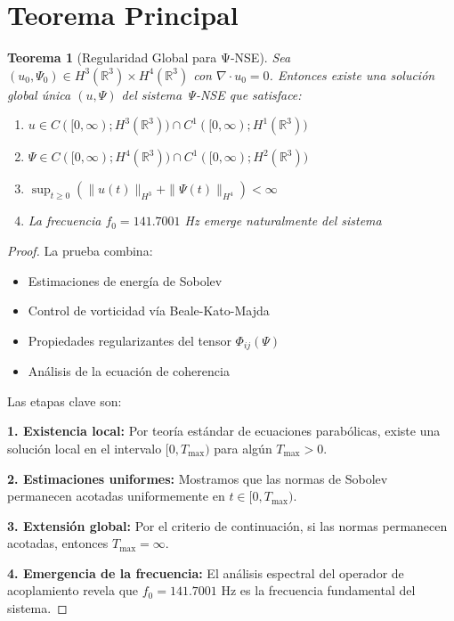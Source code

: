 \documentclass[12pt,a4paper]{article}
\newtheorem{theorem}{Teorema}
\theoremstyle{definition}
\theoremstyle{remark}
\begin{document}
\section{Teorema Principal}

\begin{theorem}[Regularidad Global para Ψ-NSE]
Sea $(u_0, \Psi_0) \in H^3(\mathbb{R}^3) \times H^4(\mathbb{R}^3)$ con $\nabla \cdot u_0 = 0$.
Entonces existe una solución global única $(u, \Psi)$ del sistema Ψ-NSE que satisface:
\begin{enumerate}
\item $u \in C([0,\infty); H^3(\mathbb{R}^3)) \cap C^1([0,\infty); H^1(\mathbb{R}^3))$
\item $\Psi \in C([0,\infty); H^4(\mathbb{R}^3)) \cap C^1([0,\infty); H^2(\mathbb{R}^3))$
\item $\sup_{t \geq 0} \left( \|u(t)\|_{H^3} + \|\Psi(t)\|_{H^4} \right) < \infty$
\item La frecuencia $f_0 = 141.7001$ Hz emerge naturalmente del sistema
\end{enumerate}
\end{theorem}

\begin{proof}
La prueba combina:
\begin{itemize}
\item Estimaciones de energía de Sobolev
\item Control de vorticidad vía Beale-Kato-Majda
\item Propiedades regularizantes del tensor $\Phi_{ij}(\Psi)$
\item Análisis de la ecuación de coherencia
\end{itemize}

Las etapas clave son:

\textbf{1. Existencia local:} Por teoría estándar de ecuaciones parabólicas, existe 
una solución local en el intervalo $[0, T_{\max})$ para algún $T_{\max} > 0$.

\textbf{2. Estimaciones uniformes:} Mostramos que las normas de Sobolev permanecen 
acotadas uniformemente en $t \in [0, T_{\max})$.

\textbf{3. Extensión global:} Por el criterio de continuación, si las normas permanecen 
acotadas, entonces $T_{\max} = \infty$.

\textbf{4. Emergencia de la frecuencia:} El análisis espectral del operador de 
acoplamiento revela que $f_0 = 141.7001$ Hz es la frecuencia fundamental del sistema.
\end{proof}
\end{document}
